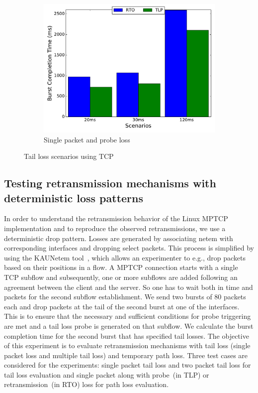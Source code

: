 \documentclass[10pt,conference]{IEEEtran}
\begin{document}
\begin{figure}
\begin{subfigure}{0.32\textwidth}
	\includegraphics[angle=0, width=\textwidth, natwidth=578.16,natheight=433.62]{plots/T1PP.pdf}
	\caption{Single packet and probe loss }\label{t1pp}
 \end{subfigure}
 \caption{Tail loss scenarios using TCP}\label{tcpf}
\end{figure}

\subsection{Testing retransmission mechanisms with deterministic loss patterns}
In order to understand the retransmission behavior of the Linux MPTCP implementation and to reproduce the observed retransmissions, we use a 
deterministic drop pattern. Losses are generated by associating netem with corresponding interfaces and dropping select packets. This process 
is simplified by using the KAUNetem tool~\cite{Garcia2016}, which allows an experimenter to e.g., drop packets based on their positions in a flow. 
A MPTCP connection starts with a single TCP subflow and subsequently, one or more subflows are added following an agreement between the client 
and the server. So one has to wait both in time and packets for the second subflow establishment. We send two bursts of 80 packets each and drop 
packets at the tail of the second burst at one of the interfaces. This is to ensure that the necessary and sufficient conditions for probe triggering 
are met and a tail loss probe is generated on that subflow. We calculate the burst completion time for the second burst that has specified tail 
losses. The objective of this experiment is to evaluate retransmission mechanisms with tail loss (single packet loss and multiple tail loss) and 
temporary path loss. Three test cases are considered for the experiments: single packet tail loss and two packet tail loss for tail loss evaluation 
and single packet along with probe~(in TLP) or retransmission~(in RTO) loss for path loss evaluation. 
\end{document}
